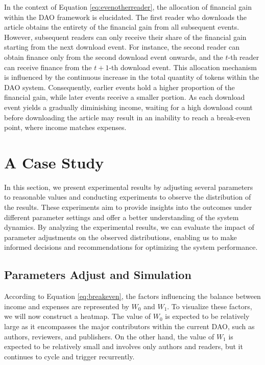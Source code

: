 \documentclass[lettersize,journal]{IEEEtran}
\begin{document}
In the context of Equation \ref{eq:evenotherreader}, the allocation of financial gain within the DAO framework is elucidated. The first reader who downloads the article obtains the entirety of the financial gain from all subsequent events. However, subsequent readers can only receive their share of the financial gain starting from the next download event. For instance, the second reader can obtain finance only from the second download event onwards, and the $t$-th reader can receive finance from the $t+1$-th download event.
This allocation mechanism is influenced by the continuous increase in the total quantity of tokens within the DAO system. Consequently, earlier events hold a higher proportion of the financial gain, while later events receive a smaller portion. As each download event yields a gradually diminishing income, waiting for a high download count before downloading the article may result in an inability to reach a break-even point, where income matches expenses.


\section{A Case Study \label{sec:performance}}

In this section, we present experimental results by adjusting several parameters to reasonable values and conducting experiments to observe the distribution of the results. These experiments aim to provide insights into the outcomes under different parameter settings and offer a better understanding of the system dynamics. By analyzing the experimental results, we can evaluate the impact of parameter adjustments on the observed distributions, enabling us to make informed decisions and recommendations for optimizing the system performance.

\subsection{ Parameters Adjust and Simulation}

According to Equation \ref{eq:breakeven}, the factors influencing the balance between income and expenses are represented by $W_0$ and $W_1$. To visualize these factors, we will now construct a heatmap. The value of $W_0$ is expected to be relatively large as it encompasses the major contributors within the current DAO, such as authors, reviewers, and publishers. On the other hand, the value of $W_1$ is expected to be relatively small and involves only authors and readers, but it continues to cycle and trigger recurrently. 
\end{document}
